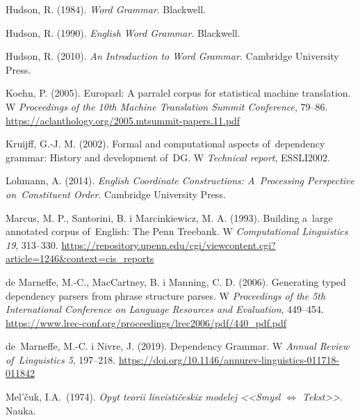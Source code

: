 \documentclass[licencjacka]{pracamgr_Kogni}
\begin{document}
\begin{thebibliography}{99}
        Hudson, R. (1984). \textit{Word Grammar}.
        Blackwell.

        Hudson, R. (1990). \textit{English Word Grammar}.
        Blackwell.

        Hudson, R. (2010). \textit{An Introduction to Word Grammar.} Cambridge University Press.

        Koehn, P. (2005).
        Europarl: A parralel corpus for statistical machine translation.
        W \textit{Proceedings of the 10th Machine Translation Summit Conference}, 79--86. \url{https://aclanthology.org/2005.mtsummit-papers.11.pdf}

        Kruijff, G.-J. M. (2002).
        Formal and computational aspects of~dependency grammar: History and development of~DG. W \textit{Technical report}, ESSLI2002.

        Lohmann, A. (2014). \textit{English Coordinate Constructions: A~Processing Perspective on~Constituent Order}. Cambridge University Press.

        Marcus, M. P., Santorini, B. i Marcinkiewicz, M. A. (1993). Building a~large annotated corpus of~English: The Penn Treebank. W \textit{Computational Linguistics 19}, 313--330.
        \url{https://repository.upenn.edu/cgi/viewcontent.cgi?article=1246&context=cis_reports}

        de Marneffe, M.-C., MacCartney, B. i Manning, C. D. (2006).
        Generating typed dependency parsers from phrase structure parses.
        W \textit{Proceedings of the 5th International Conference on Language Resources and Evaluation}, 449--454. \url{https://www.lrec-conf.org/proceedings/lrec2006/pdf/440_pdf.pdf}

        de~Marneffe, M.-C. i Nivre, J. (2019).
        Dependency Grammar.
        W \textit{Annual Review of~Linguistics 5}, 197–218. \url{https://doi.org/10.1146/annurev-linguistics-011718-011842}

        Mel'čuk, I.A.\ (1974). \textit{Opyt teorii linvističeskix modelej <<Smysl $\Leftrightarrow$ Tekst>>}.
        Nauka.


\end{thebibliography}
\end{document}
